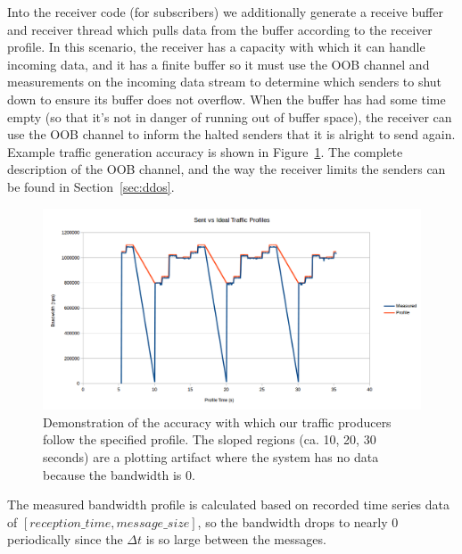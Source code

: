Into the receiver code (for subscribers) we additionally generate a
receive buffer and receiver thread which pulls data from the buffer
according to the receiver profile.  In this scenario, the receiver
has a capacity with which it can handle incoming data, and it has a
finite buffer so it must use the OOB channel and measurements on the
incoming data stream to determine which senders to shut down to ensure
its buffer does not overflow.  When the buffer has had some time empty
(so that it's not in danger of running out of buffer space), the
receiver can use the OOB channel to inform the halted senders that it
is alright to send again.  Example traffic generation accuracy is
shown in Figure~\ref{fig:generation}.  The complete description of the
OOB channel, and the way the receiver limits the senders can be found
in Section~\ref{sec:ddos}.

\begin{figure}[ht!]
  \includegraphics[width=1.1\textwidth]{../doc/src/images/results/traffic_generation.png}
  \caption{Demonstration of the accuracy with which our traffic
    producers follow the specified profile.  The sloped regions
    (ca. 10, 20, 30 seconds) are a plotting artifact where the system
    has no data because the bandwidth is 0.}
  \label{fig:generation}
\end{figure}

\begin{definition}[Note:]
The measured bandwidth profile is calculated based on
recorded time series data of $[reception\_time,
  message\_size]$, so the bandwidth drops to nearly 0
periodically since the $\Delta t$ is so large between
the messages.
\end{definition}

